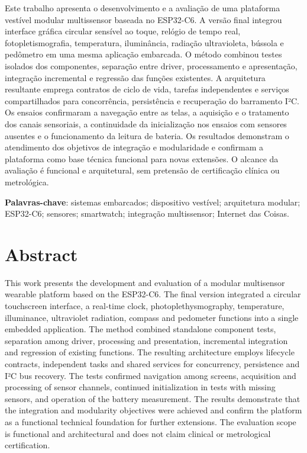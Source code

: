 \documentclass[a4paper,12pt]{article}
\begin{document}
Este trabalho apresenta o desenvolvimento e a avaliação de uma
plataforma vestível modular multissensor baseada no ESP32-C6. A versão
final integrou interface gráfica circular sensível ao toque, relógio de
tempo real, fotopletismografia, temperatura, iluminância, radiação
ultravioleta, bússola e pedômetro em uma mesma aplicação embarcada. O
método combinou testes isolados dos componentes, separação entre
driver, processamento e apresentação, integração incremental e regressão
das funções existentes. A arquitetura resultante emprega contratos de
ciclo de vida, tarefas independentes e serviços compartilhados para
concorrência, persistência e recuperação do barramento I²C. Os ensaios
confirmaram a navegação entre as telas, a aquisição e o tratamento dos
canais sensoriais, a continuidade da inicialização nos ensaios com
sensores ausentes e o funcionamento da leitura de bateria. Os resultados
demonstram o atendimento dos objetivos de integração e
modularidade e confirmam a plataforma como base técnica funcional para
novas extensões. O alcance da avaliação é funcional e arquitetural, sem
pretensão de certificação clínica ou metrológica.

\noindent\textbf{Palavras-chave}: sistemas embarcados; dispositivo
vestível; arquitetura modular; ESP32-C6; sensores; smartwatch;
integração multissensor; Internet das Coisas.

\clearpage
\section*{Abstract}

This work presents the development and evaluation of a modular
multisensor wearable platform based on the ESP32-C6. The final version
integrated a circular touchscreen interface, a real-time clock,
photoplethysmography, temperature, illuminance, ultraviolet radiation,
compass and pedometer functions into a single embedded application. The
method combined standalone component tests, separation among driver,
processing and presentation, incremental integration and regression of
existing functions. The resulting architecture employs lifecycle
contracts, independent tasks and shared services for concurrency,
persistence and I²C bus recovery. The tests confirmed navigation among
screens, acquisition and processing of sensor channels, continued
initialization in tests with missing sensors, and operation of the
battery measurement. The results demonstrate that the integration
and modularity objectives were achieved and confirm the platform as a
functional technical foundation for further extensions. The evaluation
scope is functional and architectural and does not claim clinical or
metrological certification.
\end{document}
